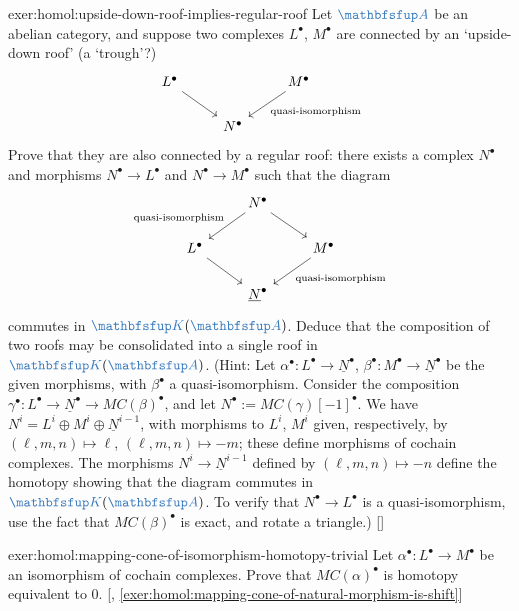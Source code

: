 \begin{exer}{\exerused{}}{exer:homol:upside-down-roof-implies-regular-roof}
  Let $\categ{A}$ be an abelian category, and suppose two complexes
  $L^\bullet$, $M^\bullet$ are connected by an `upside-down roof' (a
  `trough'?)
  \[\begin{tikzcd}
      L^\bullet \arrow[dr] & & M^\bullet \arrow[dl,"\text{quasi-isomorphism}"] \\
      & N^\bullet &
    \end{tikzcd}\] Prove that they are also connected by a regular
  roof: there exists a complex $N^\bullet$ and morphisms
  $N^\bullet \to L^\bullet$ and $N^\bullet \to M^\bullet$ such that
  the diagram
  \[\begin{tikzcd}
      & N^\bullet \arrow[dl,"\text{quasi-isomorphism}"'] \arrow[dr] & \\
      L^\bullet \arrow[dr] & & M^\bullet \arrow[dl,"\text{quasi-isomorphism}"] \\
      & \underline{N}^\bullet &
    \end{tikzcd}\] commutes in $\categ{K}(\categ{A})$. Deduce that the
  composition of two roofs may be consolidated into a single roof in
  $\categ{K}(\categ{A})$. (Hint: Let
  $\alpha^\bullet : L^\bullet \to \underline{N}^\bullet$,
  $\beta^\bullet : M^\bullet \to \underline{N}^\bullet$ be the given
  morphisms, with $\beta^\bullet$ a quasi-isomorphism. Consider the
  composition
  $\gamma^\bullet : L^\bullet \to \underline{N}^\bullet \to
  MC(\beta)^\bullet$, and let $N^\bullet :=
  MC(\gamma)[-1]^\bullet$. We have
  $N^i = L^i \oplus M^i \oplus \underline{N}^{i-1}$, with morphisms to
  $L^i$, $M^i$ given, respectively, by $(\ell,m,n) \mapsto \ell$,
  $(\ell,m,n) \mapsto -m$; these define morphisms of cochain
  complexes. The morphisms $N^i \to \underline{N}^{i-1}$ defined by
  $(\ell,m,n) \mapsto -n$ define the homotopy showing that the diagram
  commutes in $\categ{K}(\categ{A})$. To verify that
  $N^\bullet \to L^\bullet$ is a quasi-isomorphism, use the fact that
  $MC(\beta)^\bullet$ is exact, and rotate a triangle.)
  []
\end{exer}

\begin{exer}{\exerused{}}{exer:homol:mapping-cone-of-isomorphism-homotopy-trivial}
  Let $\alpha^\bullet : L^\bullet \to M^\bullet$ be an isomorphism of
  cochain complexes. Prove that $MC(\alpha)^\bullet$ is homotopy
  equivalent to $0$. [,
  \ref{exer:homol:mapping-cone-of-natural-morphism-is-shift}]
\end{exer}

